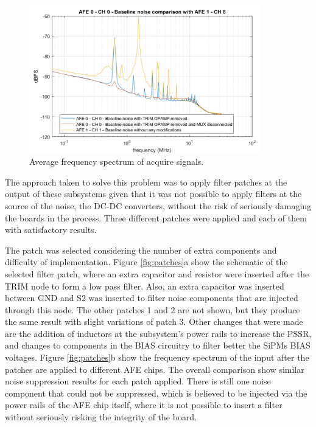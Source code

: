 \begin{figure}[h]
\centering
\includegraphics[width=100mm]{Images/noise_1.png}
\caption[]{Average frequency spectrum of acquire signals.}
\label{fig:noise_1}
\end{figure}

The approach taken to solve this problem was to apply filter patches at the output of these subsystems given that it was not possible to apply filters at the source of the noise, the DC-DC converters, without the risk of seriously damaging the boards in the process. Three different patches were applied and each of them with satisfactory results. 

The patch was selected considering the number of extra components and difficulty of implementation. Figure \ref{fig:patches}a show the schematic of the selected filter patch, where an extra capacitor and resistor were inserted after the TRIM node to form a low pass filter. Also, an extra capacitor was inserted between GND and S2 was inserted to filter noise components that are injected through this node. The other patches 1 and 2 are not shown, but they produce the same result with slight variations of patch 3. Other changes that were made are the addition of inductors at the subsystem's power rails to increase the PSSR, and changes to components in the BIAS circuitry to filter better the SiPMs BIAS voltages. Figure \ref{fig:patches}b show the frequency spectrum of the input after the patches are applied to different AFE chips. The overall comparison show similar noise suppression results for each patch applied. There is still one noise component that could not be suppressed, which is believed to be injected via the power rails of the AFE chip itself, where it is not possible to insert a filter without seriously risking the integrity of the board. 

